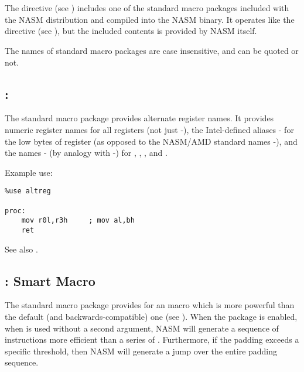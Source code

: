 \chapter{}
\label{ch:macropkg}

The  directive (see ) includes one of
the standard macro packages included with the NASM distribution and compiled
into the NASM binary. It operates like the  directive (see
), but the included contents is provided by NASM itself.

The names of standard macro packages are case insensitive, and can be
quoted or not.

\section{: }
\label{sec:pkgaltreg}

The  standard macro package provides alternate register
names. It provides numeric register names for all registers (not just
-), the Intel-defined aliases -
for the low bytes of register (as opposed to the NASM/AMD standard names
-), and the names - (by analogy
with -) for , , ,
and .

Example use:

\begin{lstlisting}
%use altreg

proc:
    mov r0l,r3h     ; mov al,bh
    ret
\end{lstlisting}

See also .

\section{: Smart  Macro}
\label{sec:pkgsmartalign}

The  standard macro package provides for an
 macro which is more powerful than the default (and
backwards-compatible) one (see ). When the
 package is enabled, when  is used without
a second argument, NASM will generate a sequence of instructions more
efficient than a series of . Furthermore, if the padding
exceeds a specific threshold, then NASM will generate a jump over
the entire padding sequence.

